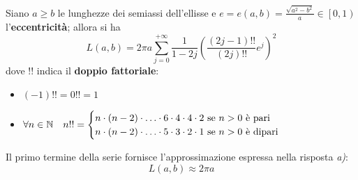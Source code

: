\begin{theorema}~{}\\
	Siano $a\geq b$ le lunghezze dei semiassi dell'ellisse e $e=e\left(a,b\right)=\frac{\sqrt{a^2-b^2}}{a}\in\left[0,1\right)$ l'\textbf{eccentricità}; allora si ha
	\begin{equation}
		L\left(a,b\right)=2\pi a\sum_{j=0}^{+\infty}\frac{1}{1-2j}\left(\frac{\left(2j-1\right)!!}{\left(2j\right)!!}e^j\right)^2
	\end{equation}
dove $!!$ indica il \textbf{doppio fattoriale}:
\begin{itemize}
	\item $\left(-1\right)!!=0!!=1$
	\item $\forall n\in\mathbb{N}\quad n!!=\begin{cases}
		n\cdot \left(n-2\right)\cdot \ldots \cdot 6 \cdot 4 \cdot 4 \cdot 2\text{ se }n>0\text{ è pari}\\
		n\cdot \left(n-2\right)\cdot \ldots \cdot 5 \cdot 3 \cdot 2 \cdot 1\text{ se }n>0\text{ è dipari}\\
	\end{cases}$
\end{itemize}
\end{theorema}
Il primo termine della serie fornisce l'approssimazione espressa nella risposta \textit{a)}:
\begin{equation*}
	L\left(a,b\right)\approx 2\pi a
\end{equation*}
